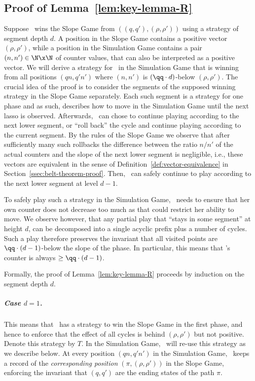 

\subsection{Proof of Lemma~\ref{lem:key-lemma-R}}  \label{sec:proof-R}

Suppose \R\ wins the Slope Game from $((q,q'), (\rho, \rho'))$ using a strategy of segment depth $d$.
A position in the Slope Game contains a positive vector $(\rho,\rho')$,
while a position in the Simulation Game contains a pair $(n,n') \in \N\x\N$ 
of counter values, that can also be interpreted as a positive vector.
We will derive a strategy for \R\ in the Simulation Game that is winning from all positions
$(qn,q'n')$ where $(n,n')$ is $(\qq \cdot d)$-below $(\rho,\rho')$.
The crucial idea of the proof is to consider the segments of the supposed winning strategy in the
Slope Game separately.
Each such segment is a strategy for one phase and as such, describes how to move in
the Simulation Game until the next lasso is observed. Afterwards, \R\ can
chose to continue playing according to the next lower segment, or ``roll back'' the
cycle and continue playing according to the current segment.
By the rules of the Slope Game we observe that after sufficiently many such rollbacks
the difference between the ratio $n/n'$ of the actual counters and the slope of the next
lower segment is negligible, i.e., these vectors are equivalent in the sense
of Definition~\ref{def:vector-equivalence} in Section~\ref{ssec:belt-theorem-proof}.
Then, \R\ can safely continue to play according to the next lower segment at level
$d-1$.


To safely play such a strategy in the Simulation Game, \R\ needs to ensure that her own
counter does not decrease too much as that could restrict her ability to move.
We observe however, that any partial play that ``stays in some segment'' at height $d$,
can be decomposed into a single acyclic prefix plus a number of cycles.
Such a play therefore preserves the invariant that all visited points are
$\qq\cdot (d-1)$-below the slope of the phase. In particular, this means that \R's
counter is always $\ge\qq\cdot(d-1)$.

Formally, the proof of Lemma~\ref{lem:key-lemma-R} proceeds by induction on the segment depth $d$.

\subparagraph*{Case $d = 1$.} 
This means that \R\ has a strategy to win the Slope Game in the first phase,
and hence to enforce that the effect of all cycles is behind $(\rho,\rho')$ but not
positive. Denote this strategy by $T$.
In the Simulation Game, \R\ will re-use this strategy as we describe below.
At every position $(qn,q'n')$ in the Simulation Game, 
\R\ keeps a record of the \emph{corresponding position} $(\pi, (\rho,\rho'))$ in the Slope Game, enforcing the
invariant that $(q,q')$ are the ending states of the path $\pi$.

